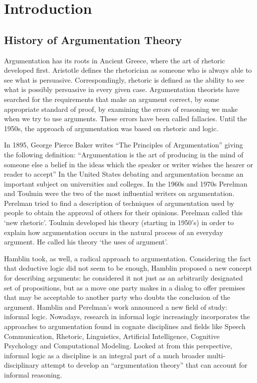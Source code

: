 \section{Introduction}
\subsection{History of Argumentation Theory}
\par
Argumentation has its roots in Ancient Greece, where the art of rhetoric developed first. Aristotle defines the rhetorician as someone who is always able to see what is persuasive. Correspondingly, rhetoric is defined as the ability to see what is possibly persuasive in every given case.  Argumentation theorists have searched for the requirements that make an argument correct, by some appropriate standard of proof, by examining the errors of reasoning we make when we try to use arguments. These errors have been called fallacies. Until the 1950s, the approach of argumentation was based on rhetoric and logic.
\par
In 1895, George Pierce Baker writes “The Principles of Argumentation” giving the following definition: ``Argumentation is the art of producing in the mind of someone else a belief in the ideas which the speaker or writer wishes the hearer or reader to accept'' 
In the United States debating and argumentation became an important subject on universities and colleges. In the 1960s and 1970s Perelman and Toulmin were the two of the most influential writers on argumentation. Perelman tried to find a description of techniques of argumentation used by people to obtain the approval of others for their opinions. Perelman called this `new rhetoric'. Toulmin developed his theory (starting in 1950’s) in order to explain how argumentation occurs in the natural process of an everyday argument. He called his theory `the uses of argument'. 
\par
Hamblin took, as well, a radical approach to argumentation. Considering the fact that deductive logic did not seem to be enough, Hamblin proposed a new concept for describing arguments: he considered it not just as an arbitrarily designated set of propositions, but as a move one party makes in a dialog to offer premises that may be acceptable to another party who doubts the conclusion of the argument.
Hamblin and Perelman’s work announced a new field of study: informal logic. Nowadays,  research in informal logic increasingly incorporates the approaches to argumentation found in cognate disciplines and fields like Speech Communication, Rhetoric, Linguistics, Artificial Intelligence, Cognitive Psychology and Computational Modeling. Looked at from this perspective, informal logic as a discipline is an integral part of a much broader multi-disciplinary attempt to develop an ``argumentation theory'' that can account for informal reasoning.

